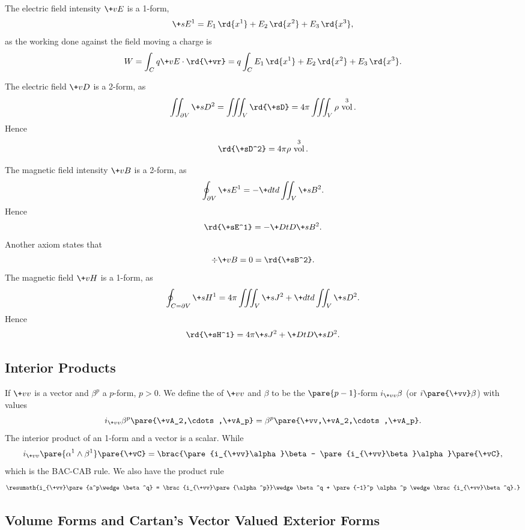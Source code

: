 \documentclass[hidelinks]{article}
\DeclareMathOperator{\vol}{vol}
\let\oldgloss\gloss
\def\gloss#1{\textbf{\oldgloss{#1}}}
\begin{document}
The electric field intensity $\+vE$ is a 1-form,
\[ \+sE^1 = E_1 \,\rd{x^1} + E_2\,\rd{x^2} + E_3\,\rd{x^3}, \]
as the working done against the field moving a charge is
\[ W = \int_C q\+vE\cdot \rd{\+vr} = q\int_C E_1\,\rd{x^1} + E_2\,\rd{x^2} + E_3\,\rd{x^3}. \]
\par
The electric field $\+vD$ is a 2-form, as
\[ \iint_{\partial V} \+sD^2 = \iiint_V \rd{\+sD} = 4\pi \iiint_V \rho\,\vol^3. \]
Hence
\[ \rd{\+sD^2} = 4\pi \rho\,\vol^3. \]
\par
The magnetic field intensity $\+vB$ is a 2-form, as
\[ \oint_{\partial V} \+sE^1 = -\+dtd{}\iint_V \+sB^2. \]
Hence
\[ \rd{\+sE^1} = -\+DtD{\+sB^2}. \]
Another axiom states that
\[ \div \+vB = 0 = \rd{\+sB^2}. \]
The magnetic field $\+vH$ is a 1-form, as
\[ \oint_{C=\partial V} \+sH^1 = 4\pi \iiint_V \+sJ^2 + \+dtd{}\iint_V \+sD^2. \]
Hence
\[ \rd{\+sH^1} = 4\pi \+sJ^2 + \+DtD{\+sD^2}. \]


\subsection{Interior Products} %
\label{sub:interior_products}

If $\+vv$ is a vector and $\beta^p$ a $p$-form, $p > 0$. We define the  of $\+vv$ and $\beta$ to be the $\pare{p-1}$-form $i_{\+vv}\beta$ (or $i\pare{\+vv}\beta$) with values
\[ i_{\+vv}\beta^p\pare{\+vA_2,\cdots,\+vA_p} = \beta^p\pare{\+vv,\+vA_2,\cdots,\+vA_p}. \]
The interior product of an 1-form and a vector is a scalar. While
\[ i_{\+vv}\pare{\alpha^1\wedge \beta^1}\pare{\+vC} = \brac{\pare{i_{\+vv}\alpha}\beta - \pare{i_{\+vv}\beta}\alpha}\pare{\+vC}, \]
which is the BAC-CAB rule. We also have the product rule
\[ \resumath{i_{\+vv}\pare{a^p\wedge \beta^q} = \brac{i_{\+vv}\pare{\alpha^p}}\wedge \beta^q + \pare{-1}^p \alpha^p \wedge\brac{i_{\+vv}\beta^q}.} \]


\subsection{Volume Forms and Cartan's Vector Valued Exterior Forms} %
\label{sub:volume_forms_and_cartan_s_vector_valued_exterior_forms}
\end{document}
